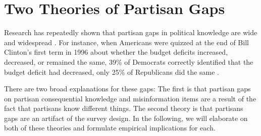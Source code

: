 \documentclass[12pt, letterpaper]{article}
\begin{document}
\newpage

\section*{Two Theories of Partisan Gaps}
\label{sec:theory}

Research has repeatedly shown that partisan gaps in political knowledge are wide and widespread \citep{bartels_2002, jerit2012partisan, lodgetaber_2013}. For instance, when Americans were quizzed at the end of Bill Clinton's first term in 1996 about whether the budget deficits increased, decreased, or remained the same, 39\% of Democrats correctly identified that the budget deficit had decreased, only 25\% of Republicans did the same \citep[280]{achen2016democracy}.


There are two broad explanations for these gaps: The first is that partisan gaps on partisan consequential knowledge and misinformation items are a result of the fact that partisans know different things. The second theory is that partisans gaps are an artifact of the survey design. In the following, we will elaborate on both of these theories and formulate empirical implications for each.



\end{document}
